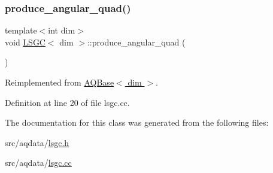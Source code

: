 \subsubsection{\texorpdfstring{produce\+\_\+angular\+\_\+quad()}{produce\_angular\_quad()}}
{\footnotesize\ttfamily template$<$int dim$>$ \\
void \hyperlink{class_l_s_g_c}{L\+S\+GC}$<$ dim $>$\+::produce\+\_\+angular\+\_\+quad (\begin{DoxyParamCaption}{ }\end{DoxyParamCaption})\hspace{0.3cm}{\ttfamily [virtual]}}



Reimplemented from \hyperlink{class_a_q_base_a16c7871be0da6c112f547f39d50258fd}{A\+Q\+Base$<$ dim $>$}.



Definition at line 20 of file lsgc.\+cc.



The documentation for this class was generated from the following files\+:\begin{DoxyCompactItemize}
\item 
src/aqdata/\hyperlink{lsgc_8h}{lsgc.\+h}\item 
src/aqdata/\hyperlink{lsgc_8cc}{lsgc.\+cc}\end{DoxyCompactItemize}
